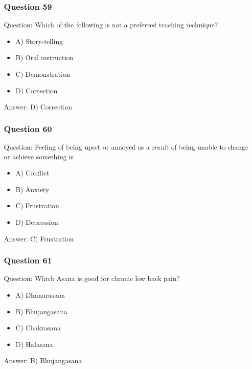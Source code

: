 \begin{frame}[fragile]\frametitle{Question 59}
Question: Which of the following is not a preferred teaching technique?
\begin{itemize}
\item A) Story-telling
\item B) Oral instruction
\item C) Demonstration
\item D) Correction
\end{itemize}
Answer: D) Correction
\end{frame}

\begin{frame}[fragile]\frametitle{Question 60}
Question: Feeling of being upset or annoyed as a result of being unable to change or achieve something is
\begin{itemize}
\item A) Conflict
\item B) Anxiety
\item C) Frustration
\item D) Depression
\end{itemize}
Answer: C) Frustration
\end{frame}

\begin{frame}[fragile]\frametitle{Question 61}
Question: Which Asana is good for chronic low back pain?
\begin{itemize}
\item A) Dhanurasana
\item B) Bhujangasana
\item C) Chakrasana
\item D) Halasana
\end{itemize}
Answer: B) Bhujangasana
\end{frame}
